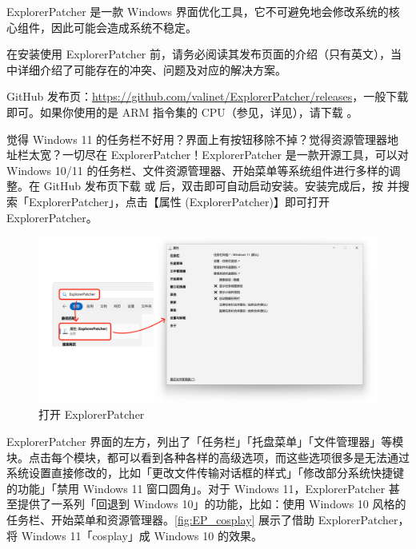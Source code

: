 \begin{dangerbox}
  ExplorerPatcher 是一款 Windows 界面优化工具，它不可避免地会修改系统的核心组件，因此可能会造成系统不稳定。

  在安装使用 ExplorerPatcher 前，请务必阅读其发布页面的介绍（只有英文），当中详细介绍了可能存在的冲突、问题及对应的解决方案。
\end{dangerbox}

GitHub 发布页：\url{https://github.com/valinet/ExplorerPatcher/releases}，一般下载  即可。如果你使用的是 ARM 指令集的 CPU（参见，详见），请下载 。

觉得 Windows 11 的任务栏不好用？界面上有按钮移除不掉？觉得资源管理器地址栏太宽？一切尽在 ExplorerPatcher！ExplorerPatcher 是一款开源工具，可以对 Windows 10/11 的任务栏、文件资源管理器、开始菜单等系统组件进行多样的调整。在 GitHub 发布页下载  或  后，双击即可自动启动安装。安装完成后，按  并搜索「ExplorerPatcher」，点击【属性 (ExplorerPatcher)】即可打开 ExplorerPatcher。

\begin{figure}[htb!]
  \centering
  \includegraphics[width=.75\textwidth]{assets/software/EP_open.png}
  \caption{打开 ExplorerPatcher}
  \label{fig:EP_open}
\end{figure}

ExplorerPatcher 界面的左方，列出了「任务栏」「托盘菜单」「文件管理器」等模块。点击每个模块，都可以看到各种各样的高级选项，而这些选项很多是无法通过系统设置直接修改的，比如「更改文件传输对话框的样式」「修改部分系统快捷键的功能」「禁用 Windows 11 窗口圆角」。对于 Windows 11，ExplorerPatcher 甚至提供了一系列「回退到 Windows 10」的功能，比如：使用 Windows 10 风格的任务栏、开始菜单和资源管理器。\autoref{fig:EP_cosplay} 展示了借助 ExplorerPatcher，将 Windows 11「cosplay」成 Windows 10 的效果。

